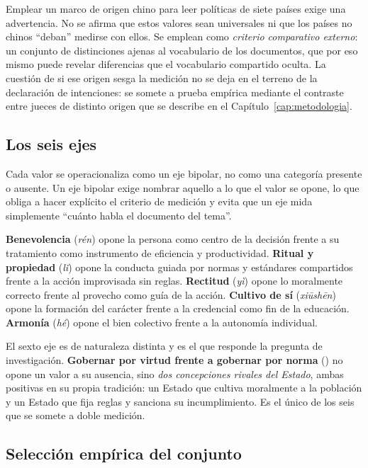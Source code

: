 Emplear un marco de origen chino para leer políticas de siete países exige una advertencia. No se afirma que estos valores sean universales ni que los países no chinos ``deban'' medirse con ellos. Se emplean como \emph{criterio comparativo externo}: un conjunto de distinciones ajenas al vocabulario de los documentos, que por eso mismo puede revelar diferencias que el vocabulario compartido oculta. La cuestión de si ese origen sesga la medición no se deja en el terreno de la declaración de intenciones: se somete a prueba empírica mediante el contraste entre jueces de distinto origen que se describe en el Capítulo~\ref{cap:metodologia}.


\subsection{Los seis ejes}

Cada valor se operacionaliza como un eje bipolar, no como una categoría presente o ausente. Un eje bipolar exige nombrar aquello a lo que el valor se opone, lo que obliga a hacer explícito el criterio de medición y evita que un eje mida simplemente ``cuánto habla el documento del tema''.

\textbf{Benevolencia} (\textit{rén}) opone la persona como centro de la decisión frente a su tratamiento como instrumento de eficiencia y productividad. \textbf{Ritual y propiedad} (\textit{lǐ}) opone la conducta guiada por normas y estándares compartidos frente a la acción improvisada sin reglas. \textbf{Rectitud} (\textit{yì}) opone lo moralmente correcto frente al provecho como guía de la acción. \textbf{Cultivo de sí} (\textit{xiūshēn}) opone la formación del carácter frente a la credencial como fin de la educación. \textbf{Armonía} (\textit{hé}) opone el bien colectivo frente a la autonomía individual.

El sexto eje es de naturaleza distinta y es el que responde la pregunta de investigación. \textbf{Gobernar por virtud frente a gobernar por norma} (\ejedf) no opone un valor a su ausencia, sino \emph{dos concepciones rivales del Estado}, ambas positivas en su propia tradición: un Estado que cultiva moralmente a la población y un Estado que fija reglas y sanciona su incumplimiento. Es el único de los seis que se somete a doble medición.


\subsection{Selección empírica del conjunto}

